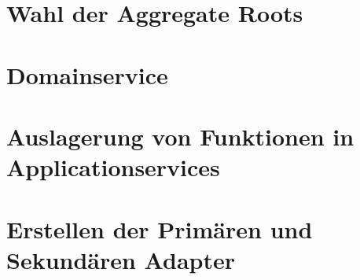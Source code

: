 \blindtext

\section{Wahl der Aggregate Roots}
\blindtext

\section{Domainservice} %
\blindtext

\section{Auslagerung von Funktionen in Applicationservices}
\blindtext

\section{Erstellen der Primären und Sekundären Adapter}
\blindtext